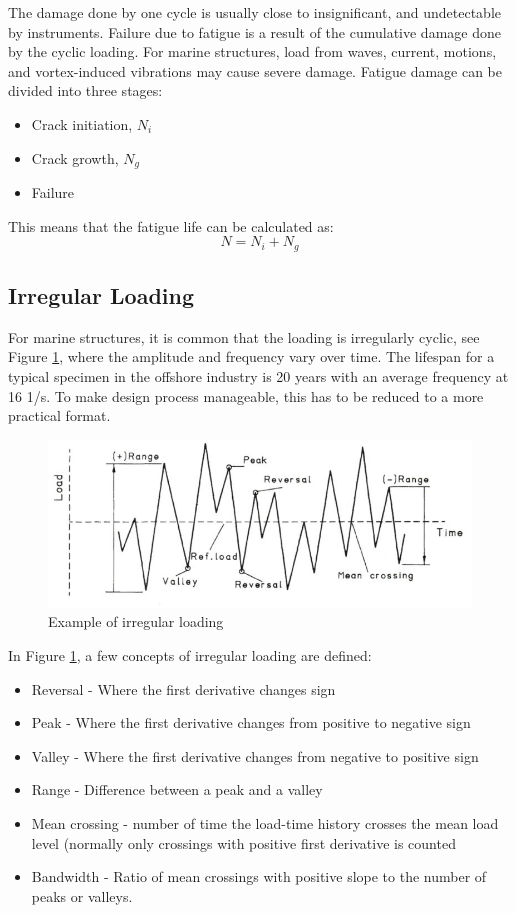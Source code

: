  \noindent The damage done by one cycle is usually close to insignificant, and undetectable by instruments. Failure due to fatigue is a result of the cumulative damage done by the cyclic loading. For marine structures, load from waves, current, motions, and vortex-induced vibrations may cause severe damage. Fatigue damage can be divided into three stages:
 \begin{itemize}
     \item Crack initiation, $N_i$
     \item Crack growth, $N_g$
     \item Failure
 \end{itemize}
 This means that the fatigue life can be calculated as:
 \begin{equation}
     N=N_i+N_g
 \end{equation}
 
\subsection{Irregular Loading}
For marine structures, it is common that the loading is irregularly cyclic, see Figure \ref{fig:irr}, where the amplitude and frequency vary over time. The lifespan for a typical specimen in the offshore industry is 20 years with an average frequency at 16 1/s. To make design process manageable, this has to be reduced to a more practical format.  

\begin{figure}[H]
\centering
\includegraphics[scale=0.8]{figures/irr}
\caption[$\; \:$Example of irregular loading]{Example of irregular loading  \cite{fatigue2016} }
 \label{fig:irr}
\end{figure}

In Figure \ref{fig:irr}, a few concepts of irregular loading are defined:
\begin{itemize}
\item Reversal - Where the first derivative changes sign
    \item Peak - Where the first derivative changes from positive to negative sign
    \item Valley - Where the first derivative changes from negative to positive sign
    \item Range - Difference between a peak and a valley
    \item Mean crossing - number of time the load-time history crosses the mean load level (normally only crossings with positive first derivative is counted
    \item Bandwidth - Ratio of mean crossings with positive slope to the number of peaks or valleys. 
\end{itemize}
 
